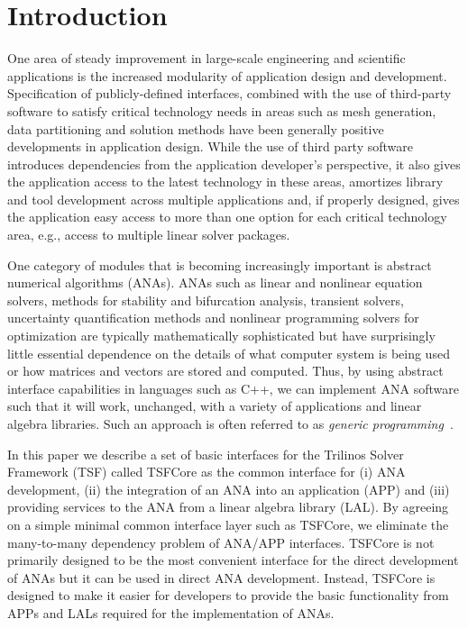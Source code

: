 \section{Introduction}

One area of steady improvement in large-scale engineering and
scientific applications is the increased modularity of application
design and development.  Specification of publicly-defined interfaces,
combined with the use of third-party software to satisfy critical
technology needs in areas such as mesh generation, data partitioning
and solution methods have been generally positive developments in
application design.  While the use of third party software introduces
dependencies from the application developer's perspective, it also
gives the application access to the latest technology in these areas,
amortizes library and tool development across multiple applications
and, if properly designed, gives the application easy access to more
than one option for each critical technology area, e.g., access to
multiple linear solver packages.

One category of modules that is becoming increasingly important is
abstract numerical algorithms (ANAs).  ANAs such as linear and
nonlinear equation solvers, methods for stability and bifurcation
analysis, transient solvers, uncertainty quantification methods and
nonlinear programming solvers for optimization are typically
mathematically sophisticated but have surprisingly little essential
dependence on the details of what computer system is being used or how
matrices and vectors are stored and computed.  Thus, by using abstract
interface capabilities in languages such as C++, we can implement ANA
software such that it will work, unchanged, with a variety of
applications and linear algebra libraries.  Such an approach is often
referred to as {\it generic
programming}~\cite{ref:boost_generic_programming}.

In this paper we describe a set of basic interfaces for the Trilinos
Solver Framework (TSF) called TSFCore as the common interface for (i)
ANA development, (ii) the integration of an ANA into an application
(APP) and (iii) providing services to the ANA from a linear algebra
library (LAL).  By agreeing on a simple minimal common interface layer
such as TSFCore, we eliminate the many-to-many dependency problem of
ANA/APP interfaces.  TSFCore is not primarily designed to be the most
convenient interface for the direct development of ANAs but it can be
used in direct ANA development.  Instead, TSFCore is designed to make
it easier for developers to provide the basic functionality from APPs
and LALs required for the implementation of ANAs.

